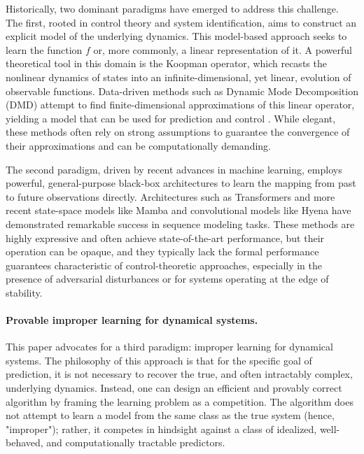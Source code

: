 \documentclass[11pt]{article}
\numberwithin{equation}{section}
\begin{document}
Historically, two dominant paradigms have emerged to address this challenge. The first, rooted in control theory and system identification, aims to construct an explicit model of the underlying dynamics. This model-based approach seeks to learn the function $f$ or, more commonly, a linear representation of it. A powerful theoretical tool in this domain is the Koopman operator, which recasts the nonlinear dynamics of states into an infinite-dimensional, yet linear, evolution of observable functions. Data-driven methods such as Dynamic Mode Decomposition (DMD) attempt to find finite-dimensional approximations of this linear operator, yielding a model that can be used for prediction and control \cite{brunton2021modernkoopmantheorydynamical}. While elegant, these methods often rely on strong assumptions to guarantee the convergence of their approximations and can be computationally demanding. 

The second paradigm, driven by recent advances in machine learning, employs powerful, general-purpose black-box architectures to learn the mapping from past to future observations directly. Architectures such as Transformers \cite{vaswani2017attention} and more recent state-space models like Mamba \cite{gu2023mamba} and convolutional models like Hyena \cite{poli2023hyena} have demonstrated remarkable success in sequence modeling tasks. These methods are highly expressive and often achieve state-of-the-art performance, but their operation can be opaque, and they typically lack the formal performance guarantees characteristic of control-theoretic approaches, especially in the presence of adversarial disturbances or for systems operating at the edge of stability.

\paragraph{Provable improper learning for dynamical systems.}
This paper advocates for a third paradigm: improper learning for dynamical systems. The philosophy of this approach is that for the specific goal of prediction, it is not necessary to recover the true, and often intractably complex, underlying dynamics. Instead, one can design an efficient and provably correct algorithm by framing the learning problem as a competition. The algorithm does not attempt to learn a model from the same class as the true system (hence, "improper"); rather, it competes in hindsight against a class of idealized, well-behaved, and computationally tractable predictors. 
\end{document}
